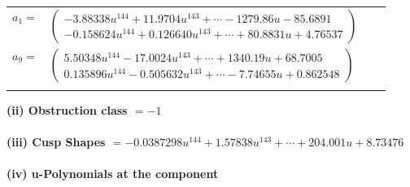 \documentclass[1p]{elsarticle_modified}
\theoremstyle{definition}
\begin{document}
\begin{tabular}{m{7pt} m{180pt} m{7pt} m{180pt} }
\flushright $a_{1}=$&$\begin{pmatrix}-3.88338 u^{144}+11.9704 u^{143}+\cdots-1279.86 u-85.6891\\-0.158624 u^{144}+0.126640 u^{143}+\cdots+80.8831 u+4.76537\end{pmatrix}$ \\
\flushright $a_{9}=$&$\begin{pmatrix}5.50348 u^{144}-17.0024 u^{143}+\cdots+1340.19 u+68.7005\\0.135896 u^{144}-0.505632 u^{143}+\cdots-7.74655 u+0.862548\end{pmatrix}$\\&\end{tabular}
\flushleft \textbf{(ii) Obstruction class $= -1$}\\~\\
\flushleft \textbf{(iii) Cusp Shapes $= -0.0387298 u^{144}+1.57838 u^{143}+\cdots+204.001 u+8.73476$}\\~\\
\newpage\renewcommand{\arraystretch}{1}
\flushleft \textbf{(iv) u-Polynomials at the component}\newline \\
\end{document}
